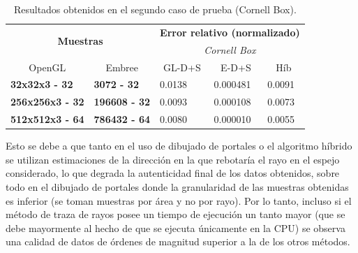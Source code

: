 \begin{table}[htbp!]
	\centering
	\begin{tabular}{|l|l|l|l|l|}
		\hline
		\multicolumn{2}{|c|}{\multirow{2}{*}{\textbf{Muestras}}} & \multicolumn{3}{c|}{\textbf{Error relativo (normalizado)}}\\ \cline{3-5} 
		\multicolumn{2}{|c|}{}                   & \multicolumn{3}{c|}{\textit{Cornell Box}}                                \\ \cline{1-5}
		\multicolumn{1}{|c|}{OpenGL} &\multicolumn{1}{c|}{Embree} & \multicolumn{1}{c|}{GL-D+S} & \multicolumn{1}{c|}{E-D+S} & \multicolumn{1}{c|}{Híb} \\ \hline
		\textbf{32x32x3 - 32}                                &
		\textbf{3072 - 32}                                & 0.0138                         & 0.000481                          & 0.0091                                \\ \hline
		\textbf{256x256x3 - 32}                               &
		\textbf{196608 - 32}                               & 0.0093                         & 0.000108                         & 0.0073                             \\ \hline
		\textbf{512x512x3 - 64} &\textbf{786432 - 64}                              & 0.0080                        & 0.000010                         & 0.0055                             \\ \hline
	\end{tabular}
	\caption{Resultados obtenidos en el segundo caso de prueba (Cornell Box).}
	\label{tab:caso2err}
\end{table}

Esto se debe a que tanto en el uso de dibujado de portales o el algoritmo híbrido se utilizan estimaciones de la dirección en la que rebotaría el rayo en el espejo considerado, lo que degrada la autenticidad final de los datos obtenidos, sobre todo en el dibujado de portales donde la granularidad de las muestras obtenidas es inferior (se toman muestras por área y no por rayo). Por lo tanto, incluso si el método de traza de rayos posee un tiempo de ejecución un tanto mayor (que se debe mayormente al hecho de que se ejecuta únicamente en la CPU) se observa una calidad de datos de órdenes de magnitud superior a la de los otros métodos.

